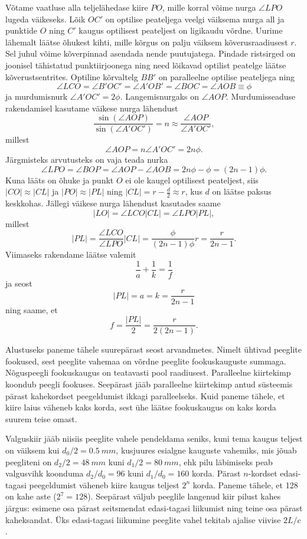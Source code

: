 \documentclass[10pt]{article}
\begin{document}
{Võtame vaatluse alla teljelähedase kiire $PO$, mille korral võime nurga $\angle LPO$ lugeda väikeseks. Lõik $OC'$ on optilise peateljega veelgi väiksema nurga all ja punktide $O$ ning $C'$ kaugus optilisest peateljest on ligikaudu võrdne. Uurime lähemalt läätse õhukest kihti, mille kõrgus on palju väiksem kõverusraadiusest $r$. Sel juhul võime kõverpinnad asendada nende puutujatega. Pindade ristsirged on joonisel tähistatud punktiirjoonega ning need lõikavad optilist peatelge läätse kõverustsentrites. Optiline kõrvaltelg $BB'$ on paralleelne optilise peateljega ning 
\[
\angle LCO=\angle B'OC'=\angle A'OB'=\angle BOC=\angle AOB\equiv \phi
\]
ja murdumisnurk $\angle A'OC'=2\phi$. Langemisnurgaks on $\angle AOP$. Murdumisseaduse rakendamisel kasutame väikese nurga lähendust 
\[
\frac{\sin(\angle AOP)}{\sin(\angle A'OC')}=n\approx \frac{\angle AOP}{\angle A'OC'},
\]
millest
\[
\angle AOP = n \angle A'OC'=2n\phi.
\]
Järgmisteks arvutusteks on vaja teada nurka
\[
\angle LPO=\angle BOP=\angle AOP - \angle AOB=2n\phi-\phi=(2n-1)\phi.
\]
Kuna lääts on õhuke ja punkt $O$ ei ole kaugel optilisest peateljest, siis $|CO|\approx|CL|$ ja $|PO|\approx|PL|$ ning $|CL|=r-\frac{d}{2}\approx r$, kus $d$ on läätse paksus keskkohas. Jällegi väikese nurga lähendust kasutades saame
\[
|LO|=\angle LCO|CL|=\angle LPO|PL|,
\]
millest
\[
|PL|=\frac{\angle LCO}{\angle LPO}|CL|=\frac{\phi}{(2n-1)\phi} r=\frac{r}{2n-1}.
\]
Viimaseks rakendame läätse valemit
\[
\frac{1}{a}+\frac{1}{k}=\frac{1}{f}
\]
ja seost
\[
|PL|=a=k=\frac{r}{2n-1}
\]
ning saame, et
\[
f=\frac{|PL|}{2}=\frac{r}{2(2n-1)}.
\]
\probend
\bigskip


\solu
Alustuseks paneme tähele suurepärast seost arvandmetes. Nimelt ühtivad peeglite fookused, sest peeglite vahemaa on võrdne peeglite fookuskauguste summaga. Nõguspeegli fookuskaugus on teatavasti pool raadiusest. Paralleelne kiirtekimp koondub peegli fookuses. Seepärast jääb paralleelne kiirtekimp antud süsteemis pärast kahekordset peegeldumist ikkagi paralleelseks. Kuid paneme tähele, et kiire laius väheneb kaks korda, sest ühe läätse fookuskaugus on kaks korda suurem teise omast.

Valguskiir jääb niisiis peeglite vahele pendeldama seniks, kuni tema kaugus teljest on väiksem kui $d_0/2 = \SI{0.5}{mm}$, kusjuures esialgne kauguste vahemiks, mis jõuab peegliteni on $d_2/2 = \SI{48}{mm}$ kuni $d_1/2 = \SI{80}{mm}$, ehk pilu läbimiseks peab valgusvihk koonduma $d_2/d_0 = 96$ kuni $d_1/d_0 = 160$ korda. Pärast $n$-kordset edasi-tagasi peegeldumist väheneb kiire kaugus teljest $2^n$ korda. Paneme tähele, et 128 on kahe aste ($2^7 = 128$). Seepärast väljub peeglile langenud kiir pilust kahes järgus: esimene osa pärast seitsmendat edasi-tagasi liikumist ning teine osa pärast kaheksandat. Üks edasi-tagasi liikumine peeglite vahel tekitab ajalise viivise $2L/c$.

}
\end{document}
